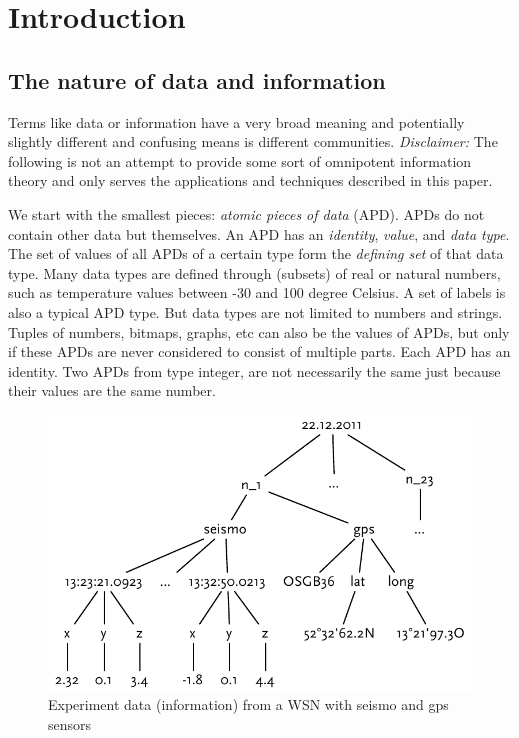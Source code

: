 \section{Introduction}\label{sec:introduction}

\subsection{The nature of data and information}\label{sec:information}

Terms like data or information have a very broad meaning and potentially slightly different and confusing means is different communities. \emph{Disclaimer:} The following is not an attempt to provide some sort of omnipotent information theory and only serves the applications and techniques described in this paper.

We start with the smallest pieces: \emph{atomic pieces of data} (APD). APDs do not contain other data but themselves. An APD has an \emph{identity}, \emph{value}, and \emph{data type}. The set of values of all APDs of a certain type form the \emph{defining set} of that data type. Many data types are defined through (subsets) of real or natural numbers, such as temperature values between -30 and 100 degree Celsius. A set of labels is also a typical APD type. But data types are not limited to numbers and strings. Tuples of numbers, bitmaps, graphs, etc can also be the values of APDs, but only if these APDs are never considered to consist of multiple parts. Each APD has an identity. Two APDs from type integer, are not necessarily the same just because their values are the same number.

\begin{figure}
  \centering
  \includegraphics[width=0.65\linewidth]{figures/example_information_graph}
  \caption{Experiment data (information) from a WSN with seismo and gps sensors}
  \label{fig:example_information_graph}
\end{figure}

